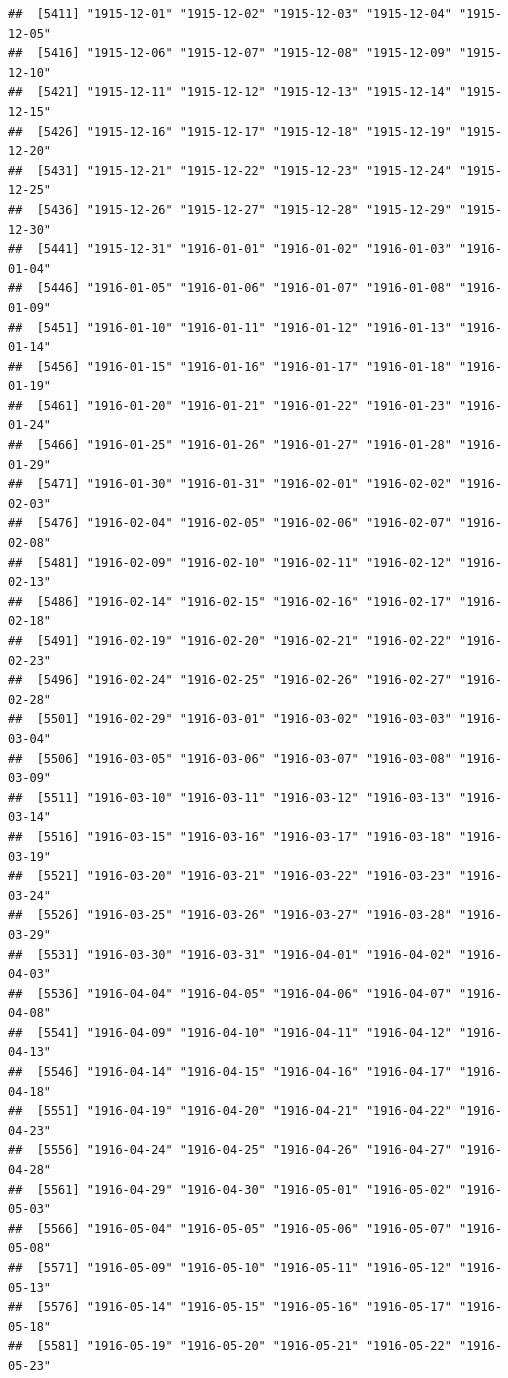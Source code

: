 \documentclass{article}\usepackage[]{graphicx}\usepackage[]{color}
\makeatletter
\newenvironment{kframe}{%
 \def\at@end@of@kframe{}%
 \ifinner\ifhmode%
  \def\at@end@of@kframe{\end{minipage}}%
  \begin{minipage}{\columnwidth}%
 \fi\fi%
 \def\FrameCommand##1{\hskip\@totalleftmargin \hskip-\fboxsep
 \colorbox{shadecolor}{##1}\hskip-\fboxsep
     \hskip-\linewidth \hskip-\@totalleftmargin \hskip\columnwidth}%
 \MakeFramed {\advance\hsize-\width
   \@totalleftmargin\z@ \linewidth\hsize
   \@setminipage}}%
 {\par\unskip\endMakeFramed%
 \at@end@of@kframe}
\newenvironment{knitrout}{}{} %
\makeatother
\begin{document}
\begin{description}
\begin{knitrout}
\begin{kframe}
\begin{verbatim}
##  [5411] "1915-12-01" "1915-12-02" "1915-12-03" "1915-12-04" "1915-12-05"
##  [5416] "1915-12-06" "1915-12-07" "1915-12-08" "1915-12-09" "1915-12-10"
##  [5421] "1915-12-11" "1915-12-12" "1915-12-13" "1915-12-14" "1915-12-15"
##  [5426] "1915-12-16" "1915-12-17" "1915-12-18" "1915-12-19" "1915-12-20"
##  [5431] "1915-12-21" "1915-12-22" "1915-12-23" "1915-12-24" "1915-12-25"
##  [5436] "1915-12-26" "1915-12-27" "1915-12-28" "1915-12-29" "1915-12-30"
##  [5441] "1915-12-31" "1916-01-01" "1916-01-02" "1916-01-03" "1916-01-04"
##  [5446] "1916-01-05" "1916-01-06" "1916-01-07" "1916-01-08" "1916-01-09"
##  [5451] "1916-01-10" "1916-01-11" "1916-01-12" "1916-01-13" "1916-01-14"
##  [5456] "1916-01-15" "1916-01-16" "1916-01-17" "1916-01-18" "1916-01-19"
##  [5461] "1916-01-20" "1916-01-21" "1916-01-22" "1916-01-23" "1916-01-24"
##  [5466] "1916-01-25" "1916-01-26" "1916-01-27" "1916-01-28" "1916-01-29"
##  [5471] "1916-01-30" "1916-01-31" "1916-02-01" "1916-02-02" "1916-02-03"
##  [5476] "1916-02-04" "1916-02-05" "1916-02-06" "1916-02-07" "1916-02-08"
##  [5481] "1916-02-09" "1916-02-10" "1916-02-11" "1916-02-12" "1916-02-13"
##  [5486] "1916-02-14" "1916-02-15" "1916-02-16" "1916-02-17" "1916-02-18"
##  [5491] "1916-02-19" "1916-02-20" "1916-02-21" "1916-02-22" "1916-02-23"
##  [5496] "1916-02-24" "1916-02-25" "1916-02-26" "1916-02-27" "1916-02-28"
##  [5501] "1916-02-29" "1916-03-01" "1916-03-02" "1916-03-03" "1916-03-04"
##  [5506] "1916-03-05" "1916-03-06" "1916-03-07" "1916-03-08" "1916-03-09"
##  [5511] "1916-03-10" "1916-03-11" "1916-03-12" "1916-03-13" "1916-03-14"
##  [5516] "1916-03-15" "1916-03-16" "1916-03-17" "1916-03-18" "1916-03-19"
##  [5521] "1916-03-20" "1916-03-21" "1916-03-22" "1916-03-23" "1916-03-24"
##  [5526] "1916-03-25" "1916-03-26" "1916-03-27" "1916-03-28" "1916-03-29"
##  [5531] "1916-03-30" "1916-03-31" "1916-04-01" "1916-04-02" "1916-04-03"
##  [5536] "1916-04-04" "1916-04-05" "1916-04-06" "1916-04-07" "1916-04-08"
##  [5541] "1916-04-09" "1916-04-10" "1916-04-11" "1916-04-12" "1916-04-13"
##  [5546] "1916-04-14" "1916-04-15" "1916-04-16" "1916-04-17" "1916-04-18"
##  [5551] "1916-04-19" "1916-04-20" "1916-04-21" "1916-04-22" "1916-04-23"
##  [5556] "1916-04-24" "1916-04-25" "1916-04-26" "1916-04-27" "1916-04-28"
##  [5561] "1916-04-29" "1916-04-30" "1916-05-01" "1916-05-02" "1916-05-03"
##  [5566] "1916-05-04" "1916-05-05" "1916-05-06" "1916-05-07" "1916-05-08"
##  [5571] "1916-05-09" "1916-05-10" "1916-05-11" "1916-05-12" "1916-05-13"
##  [5576] "1916-05-14" "1916-05-15" "1916-05-16" "1916-05-17" "1916-05-18"
##  [5581] "1916-05-19" "1916-05-20" "1916-05-21" "1916-05-22" "1916-05-23"

\end{verbatim}
\end{kframe}
\end{knitrout}
\end{description}
\end{document}
